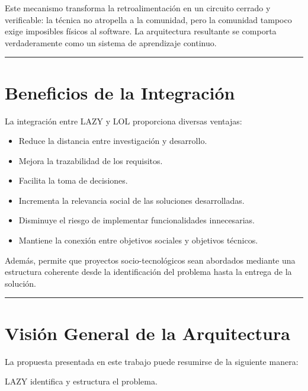 \documentclass[14pt,a4paper,oneside]{extbook}
\begin{document}
Este mecanismo transforma la retroalimentación en un circuito cerrado y verificable: la técnica no atropella a la comunidad, pero la comunidad tampoco exige imposibles físicos al software. La arquitectura resultante se comporta verdaderamente como un sistema de aprendizaje continuo.

\par\vspace{1.5em}\noindent\hfill\rule{0.25\textwidth}{0.6pt}\hfill\par\vspace{1.5em}

\section{Beneficios de la Integración}

La integración entre LAZY y LOL proporciona diversas ventajas:

\begin{itemize}
\item Reduce la distancia entre investigación y desarrollo.
\item Mejora la trazabilidad de los requisitos.
\item Facilita la toma de decisiones.
\item Incrementa la relevancia social de las soluciones desarrolladas.
\item Disminuye el riesgo de implementar funcionalidades innecesarias.
\item Mantiene la conexión entre objetivos sociales y objetivos técnicos.
\end{itemize}

Además, permite que proyectos socio-tecnológicos sean abordados mediante una estructura coherente desde la identificación del problema hasta la entrega de la solución.

\par\vspace{1.5em}\noindent\hfill\rule{0.25\textwidth}{0.6pt}\hfill\par\vspace{1.5em}

\section{Visión General de la Arquitectura}

La propuesta presentada en este trabajo puede resumirse de la siguiente manera:

LAZY identifica y estructura el problema.
\end{document}
